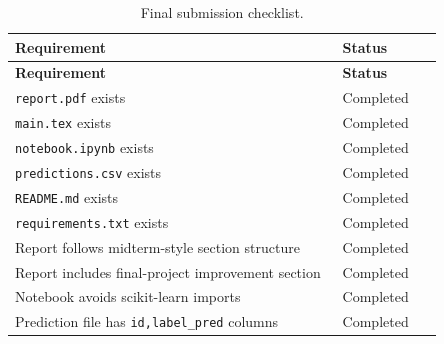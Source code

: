 ﻿\documentclass[12pt,a4paper]{article}
\begin{document}
\begin{longtable}{p{0.65\linewidth}p{0.2\linewidth}}
\caption{Final submission checklist.}\\
\toprule
\textbf{Requirement} & \textbf{Status} \\
\midrule
\endfirsthead
\toprule
\textbf{Requirement} & \textbf{Status} \\
\midrule
\endhead
\texttt{report.pdf} exists & Completed \\
\texttt{main.tex} exists & Completed \\
\texttt{notebook.ipynb} exists & Completed \\
\texttt{predictions.csv} exists & Completed \\
\texttt{README.md} exists & Completed \\
\texttt{requirements.txt} exists & Completed \\
Report follows midterm-style section structure & Completed \\
Report includes final-project improvement section & Completed \\
Notebook avoids scikit-learn imports & Completed \\
Prediction file has \texttt{id,label\_pred} columns & Completed \\
\bottomrule
\end{longtable}
\end{document}
